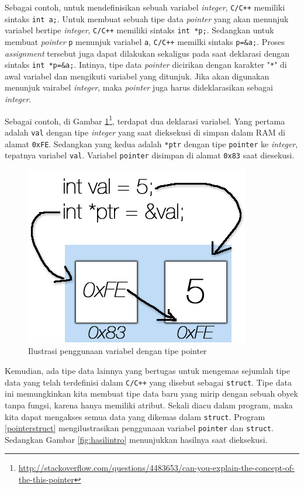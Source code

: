 Sebagai contoh, untuk mendefinisikan sebuah variabel \textit{integer}, \texttt{C/C++} memiliki sintaks \texttt{int a;}. Untuk membuat sebuah tipe data \textit{pointer} yang akan menunjuk variabel bertipe \textit{integer}, \texttt{C/C++} memiliki sintaks \texttt{int *p;}. Sedangkan untuk membuat \textit{pointer} \texttt{p} menunjuk variabel \texttt{a}, \texttt{C/C++} memilki sintaks \texttt{p=\&a;}. Proses \textit{assignment} tersebut juga dapat dilakukan sekaligus pada saat deklarasi dengan sintaks \texttt{int *p=\&a;}. Intinya, tipe data \textit{pointer} dicirikan dengan karakter "\texttt{*}" di awal variabel dan mengikuti variabel yang ditunjuk. Jika akan digunakan menunjuk vairabel \textit{integer}, maka \textit{pointer} juga harus dideklarasikan sebagai \textit{integer}.

Sebagai contoh, di Gambar \ref{fig:pointer}\footnote{\url{http://stackoverflow.com/questions/4483653/can-you-explain-the-concept-of-the-this-pointer}}, terdapat dua deklarasi variabel. Yang pertama adalah \texttt{val} dengan tipe \textit{integer} yang saat dieksekusi di simpan dalam RAM di alamat \texttt{0xFE}. Sedangkan yang kedua adalah \texttt{*ptr} dengan tipe \texttt{pointer} ke \textit{integer}, tepatnya variabel \texttt{val}. Variabel \texttt{pointer} disimpan di alamat \texttt{0x83} saat diesekusi.

\begin{figure}[H]
\centering
\includegraphics[scale=.5]{pics/pointer.png}
\caption{Ilustrasi penggunaan variabel dengan tipe pointer}
\label{fig:pointer}
\end{figure}

Kemudian, ada tipe data lainnya yang bertugas untuk mengemas sejumlah tipe data yang telah terdefinisi dalam \texttt{C/C++} yang disebut sebagai \texttt{struct}. Tipe data ini memungkinkan kita membuat tipe data baru yang mirip dengan sebuah obyek tanpa fungsi, karena hanya memiliki atribut. Sekali diacu dalam program, maka kita dapat mengakses semua data yang dikemas dalam \texttt{struct}. Program \ref{pointerstruct} mengilustrasikan penggunaan variabel \texttt{pointer} dan \texttt{struct}. Sedangkan Gambar \ref{fig:hasilintro} menunjukkan hasilnya saat dieksekusi. 

